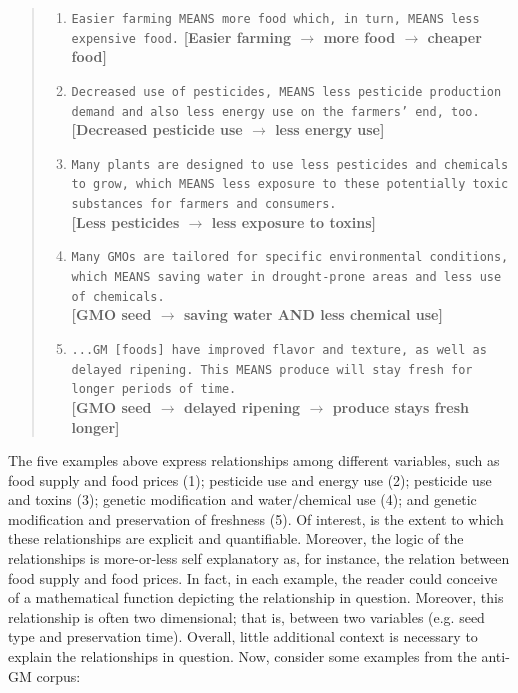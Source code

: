 \begin{footnotesize}
\begin{quote}
\begin{enumerate}

  \item \texttt{Easier farming MEANS more food which, in turn, MEANS less expensive food.} \textbf{[Easier farming $\rightarrow$ more food $\rightarrow$ cheaper food]}\\

   \item \texttt{Decreased use of pesticides, MEANS less pesticide production demand and also less energy use on the farmers' end, too.}\\ \textbf{[Decreased pesticide use $\rightarrow$ less energy use]}\\
   
   \item  \texttt{Many plants are designed to use less pesticides and chemicals to grow, which MEANS less exposure to these potentially toxic substances for farmers and consumers.}\\ \textbf{[Less pesticides $\rightarrow$ less exposure to toxins]}\\
   
   \item  \texttt{Many GMOs are tailored for specific environmental conditions, which MEANS saving water in drought-prone areas and less use of chemicals.}\\ \textbf{[GMO seed $\rightarrow$ saving water AND less chemical use]}\\
   
   \item  \texttt{...GM [foods] have improved flavor and texture, as well as delayed ripening. This MEANS produce will stay fresh for longer periods of time.}\\ \textbf{[GMO seed $\rightarrow$ delayed ripening $\rightarrow$ produce stays fresh longer]}
  
\end{enumerate}
\end{quote}
\end{footnotesize}

The five examples above express relationships among different variables, such as food supply and food prices (1); pesticide use and energy use (2); pesticide use and toxins (3); genetic modification and water/chemical use (4); and genetic modification and preservation of freshness (5). Of interest, is the extent to which these relationships are explicit and quantifiable. Moreover, the logic of the relationships is more-or-less self explanatory as, for instance, the relation between food supply and food prices. In fact, in each example, the reader could conceive of a mathematical function depicting the relationship in question. Moreover, this relationship is often two dimensional; that is, between two variables (e.g. seed type and preservation time). Overall, little additional context is necessary to explain the relationships in question. Now, consider some examples from the anti-GM corpus:

